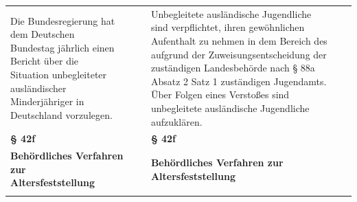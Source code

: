 \documentclass[10pt,a4paper,landscape]{article}
\begin{document}
\begin{longtable}{|L{8.2cm}|L{8.2cm}|L{8.2cm}|}
\hhline{|---|}
\textcolor{diffred}{Die Bundesregierung hat} dem \textcolor{diffred}{Deutschen  \newline Bundestag jährlich einen Bericht über die  \newline Situation unbegleiteter ausländischer  \newline Minderjähriger in Deutschland vorzulegen.} &  & \textcolor{diffgreen}{Unbegleitete ausländische Jugendliche  \newline sind verpflichtet, ihren gewöhnlichen  \newline Aufenthalt zu nehmen in} dem \textcolor{diffgreen}{Bereich des  \newline aufgrund der Zuweisungsentscheidung der  \newline zuständigen Landesbehörde nach \S{} 88a  Absatz 2 Satz 1 zuständigen Jugendamts.  \newline Über Folgen eines Verstoßes sind  \newline unbegleitete ausländische Jugendliche  \newline aufzuklären.} \\
\hhline{|---|}
\textbf{\S{} 42f} &  & \textbf{\S{} 42f} \\
\hhline{|---|}
\textbf{Behördliches Verfahren zur  \newline Altersfeststellung} &  & \textbf{Behördliches Verfahren zur  \newline Altersfeststellung} \\
\hhline{|---|}

\end{longtable}
\end{document}
